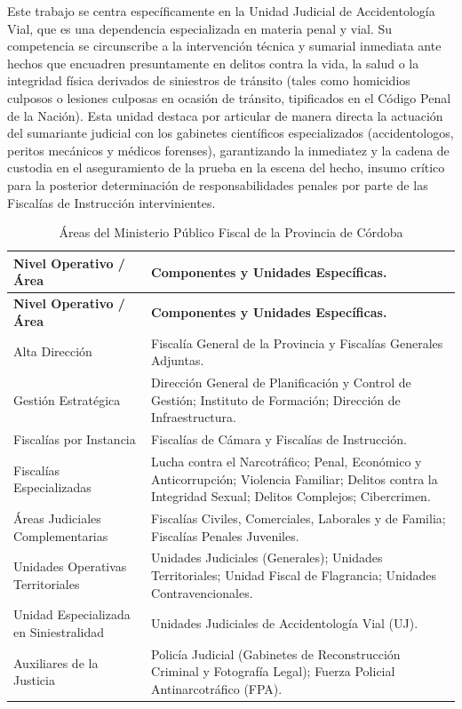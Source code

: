 Este trabajo se centra específicamente en la Unidad Judicial de Accidentología Vial, que es una dependencia especializada en materia penal y vial. Su competencia se circunscribe a la intervención técnica y sumarial inmediata ante hechos que encuadren presuntamente en delitos contra la vida, la salud o la integridad física derivados de siniestros de tránsito (tales como homicidios culposos o lesiones culposas en ocasión de tránsito, tipificados en el Código Penal de la Nación). Esta unidad destaca por articular de manera directa la actuación del sumariante judicial con los gabinetes científicos especializados (accidentologos, peritos mecánicos y médicos forenses), garantizando la inmediatez y la cadena de custodia en el aseguramiento de la prueba en la escena del hecho, insumo crítico para la posterior determinación de responsabilidades penales por parte de las Fiscalías de Instrucción intervinientes.

\iffalse
\begin{longtable}[]{@{}
>{\centering\arraybackslash}p{}
  >{\centering\arraybackslash}p{}@{}}
\caption{Áreas del Ministerio Público Fiscal de la Provincia de Córdoba}
\label{tab:areas-del-ministerio-publico-fiscal-de-l}\\
\toprule\noalign{}
\textbf{Nivel Operativo / Área} & \textbf{Componentes y Unidades Específicas.} \\
\midrule\noalign{}
\endfirsthead
\toprule\noalign{}
\textbf{Nivel Operativo / Área} & \textbf{Componentes y Unidades Específicas.} \\
\midrule\noalign{}
\endhead
\bottomrule\noalign{}
\endlastfoot
Alta Dirección & Fiscalía General de la Provincia y Fiscalías Generales Adjuntas. \\
Gestión Estratégica & Dirección General de Planificación y Control de Gestión; Instituto de Formación; Dirección de Infraestructura. \\
Fiscalías por Instancia & Fiscalías de Cámara y Fiscalías de Instrucción. \\
Fiscalías Especializadas & Lucha contra el Narcotráfico; Penal, Económico y Anticorrupción; Violencia Familiar; Delitos contra la Integridad Sexual; Delitos Complejos; Cibercrimen. \\
Áreas Judiciales Complementarias & Fiscalías Civiles, Comerciales, Laborales y de Familia; Fiscalías Penales Juveniles. \\
Unidades Operativas Territoriales & Unidades Judiciales (Generales); Unidades Territoriales; Unidad Fiscal de Flagrancia; Unidades Contravencionales. \\
Unidad Especializada en Siniestralidad & Unidades Judiciales de Accidentología Vial (UJ). \\
Auxiliares de la Justicia & Policía Judicial (Gabinetes de Reconstrucción Criminal y Fotografía Legal); Fuerza Policial Antinarcotráfico (FPA). \\
\end{longtable}

